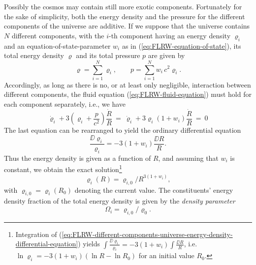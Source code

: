 Possibly the cosmos may contain still more exotic components.
Fortunately for the sake of simplicity, both the energy density and the pressure for the different components of the universe are additive. If we suppose that the universe contains $N$ different components, with the $i$-th component having an energy density $\varrho_i$ and an equation-of-state-parameter $w_i$ as in (\ref{eq:FLRW-equation-of-state}), its total energy density $\varrho$ and its total pressure $p$ are given by
\begin{equation}
	\varrho
	= \sum_{i=1}^N \varrho_i,
	\qquad
	p
	= \sum_{i=1}^N w_i \, c^2 \varrho_i
	.
	\label{eq:FLRW-different-components-universe-total-energy-and-pressure}
\end{equation}
Accordingly, as long as there is no, or at least only negligible, interaction between different components, the fluid equation (\ref{eq:FLRW-fluid-equation}) must hold for each component separately, i.e., we have
\begin{equation}
	\dot{\varrho}_i + 3 \left( \varrho_i + \frac{p}{c^2} \right) \frac{\dot{R}}{R}
	\ = \
	\dot{\varrho}_i + 3 \varrho_i \left( 1 + w_i \right) \frac{\dot{R}}{R} 
	\ = \
	0
\end{equation}
The last equation can be rearranged to yield the ordinary differential equation
\begin{equation}
	\frac{\DD \varrho_i}{\varrho_i}
	= - 3 \left( 1 + w_i \right) \frac{\DD{R}}{R}
	.
	\label{eq:FLRW-different-components-universe-energy-density-differential-equation}
\end{equation}
Thus the energy density is given as a function of $R$, and assuming that $w_i$ is constant, we obtain the exact solution\footnote{
	Integration of (\ref{eq:FLRW-different-components-universe-energy-density-differential-equation}) yields
	$
		\int \frac{\DD \varrho_i}{\varrho_i}
		= - 3 \left( 1 + w_i \right) \int \frac{\DD{R}}{R}
	$, i.e.
	$
		\ln \varrho_i = - 3 \left( 1 + w_i \right) (\ln R - \ln R_0)
	$
	for an initial value $R_0$.
}
\begin{equation}
	\varrho_i (R)
	= \varrho_{i, 0} / R^{3 (1 + w_i)},
	\label{eq:FLRW-different-components-universe-energy-density-solution}
\end{equation}
with $\varrho_{i, 0} = \varrho_i (R_0)$ denoting the current value.
The constituents' energy density fraction of the total energy density is given by the \emph{density parameter} \cite[57]{Ryden-2017}
\begin{equation}
	\Omega_i
	= \varrho_{i,0} / \varrho_{0}
	.
	\label{eq:FLRW-Omega-fraction}
\end{equation}
